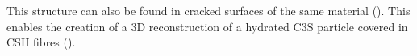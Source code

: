 This structure can also be found in cracked surfaces of the same material ().
This enables the creation of a 3D reconstruction of a hydrated \ac{C3S} particle covered in \ac{CSH} fibres ().


